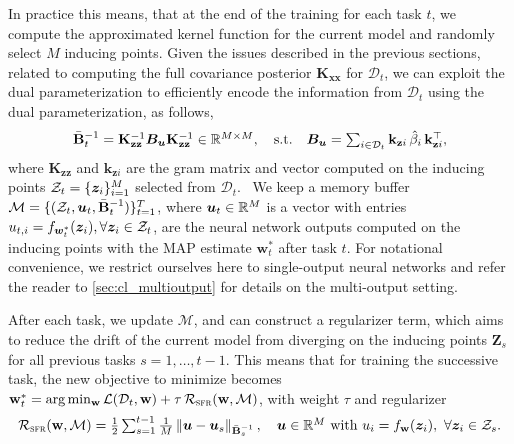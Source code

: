 \documentclass{article} %
\newcommand{\our}{\textsc{sfr}\xspace}
\newcommand{\dataset}{\ensuremath{\mathcal{D}}}
\newcommand{\weights}{\ensuremath{\mathbf{w}}}
\newcommand{\mathbold}[1]{\bm{#1}}
\newcommand{\mbf}[1]{\mathbf{#1}}
\newcommand{\MB}{\mbf{B}}
\newcommand{\MZ}{\mbf{Z}}
\newcommand{\T}{\top}
\newcommand{\MBeta}[0]{\mathbold{B}}
\newcommand{\MKzz}{\mbf{K}_{\mbf{z}\mbf{z}}}
\newcommand{\MKxx}{\mbf{K}_{\mbf{x}\mbf{x}}}
\newcommand{\vkzi}{\mbf{k}_{\mbf{z}i}}
\begin{document}
In practice this means, that at the end of the training for each task $t$, we compute the approximated kernel function for the current model and randomly select $M$ inducing points. Given the issues described in the previous sections, related to computing the full covariance posterior $\MKxx$ for $\dataset_t$, we can exploit the dual parameterization to efficiently encode the information from  $\dataset_t$ using the dual parameterization, as follows,
%
\begin{equation}\textstyle
 	\bar{\MB}^{-1}_t = \MKzz^{-1} \MBeta_\vu \MKzz^{-1} \in \R^{M \times M},
 	\quad \text{s.t.} \quad
 	\MBeta_{\vu} =  \sum_{i \in \dataset_t} \vkzi \,\hat{\beta}_{i} \, \vkzi^{\T} ,
\end{equation}
%
where $\MKzz$ and $\vkzi$ are the gram matrix and vector computed on the inducing points $\mathcal{Z}_t = \{{\bm{z}}_i\}_{i=1}^M$ selected from $\dataset_t$.\
%
We keep a memory buffer $\mathcal{M} = \{(\mathcal{Z}_t, \vu_t, \bar{\MB}^{-1}_t)\}_{t=1}^T$, where ${\bm{u}}_t \in \mathbb{R}^{M}$ is a vector with entries $u_{t, i} = f_{{\bm{w}}_t^*}({\bm{z}}_i), \forall {\bm{z}}_i \in \mathcal{Z}_t$, are the neural network outputs computed on the inducing points with the MAP estimate $\weights_t^*$ after task $t$. For notational convenience, we restrict ourselves here to single-output neural networks and refer the reader to \cref{sec:cl_multioutput} for details on the multi-output setting.

After each task, we update $\mathcal{M}$, and can construct a regularizer term, which aims to reduce the drift of the current model from diverging on the inducing points $\MZ_s$ for all previous tasks $ s = 1, \ldots, t-1$. This means that for training  the successive task, the new objective to minimize becomes $\weights_t^* = \arg\min_{\weights} \mathcal{L}(\mathcal{D}_t, \weights) + \tau \, \mathcal{R}_\textrm{\our}(\weights, \mathcal{M})$, with weight $\tau$ and regularizer
%
\begin{equation}\label{eq-cl-regularizer}\textstyle
  \mathcal{R}_\mathrm{\our}(\weights, \mathcal{M}) = \frac{1}{2} \sum_{s=1}^{t-1} \frac{1}{M}
	\left\lVert
	\vu - \vu_s %
	\right\rVert_{\bar{\MB}^{-1}_{s}}, \quad \vu \in \R^M \text{~with~} u_{i} = f_{\weights}(\vz_{i}),~\forall {\vz_i} \in \mathcal{Z}_s .
\end{equation}
\end{document}
